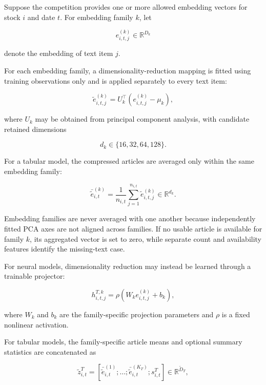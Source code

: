 \documentclass[11pt]{article}
\newcommand{\R}{\mathbb{R}}
\begin{document}
Suppose the competition provides one or more allowed embedding vectors for
stock $i$ and date $t$. For embedding family $k$, let

\begin{equation}
e^{(k)}_{i,t,j}
\in
\R^{D_k}
\end{equation}

denote the embedding of text item $j$.

For each embedding family, a dimensionality-reduction mapping is fitted using
training observations only and is applied separately to every text item:

\begin{equation}
\widetilde e^{(k)}_{i,t,j}
=
U_k^\top
\left(
e^{(k)}_{i,t,j}
-
\mu_k
\right),
\end{equation}

where $U_k$ may be obtained from principal component analysis, with candidate
retained dimensions

\begin{equation}
d_k \in \{16,32,64,128\}.
\end{equation}

For a tabular model, the compressed articles are averaged only within the same
embedding family:

\begin{equation}
\bar{\widetilde e}^{(k)}_{i,t}
=
\frac{1}{n_{i,t}}
\sum_{j=1}^{n_{i,t}}
\widetilde e^{(k)}_{i,t,j}
\in\R^{d_k}.
\end{equation}

Embedding families are never averaged with one another because independently
fitted PCA axes are not aligned across families.  If no usable article is
available for family $k$, its aggregated vector is set to zero, while separate
count and availability features identify the missing-text case.

For neural models, dimensionality reduction may instead be learned through a
trainable projector:

\begin{equation}
h^{T,k}_{i,t,j}
=
\rho
\left(
W_k e^{(k)}_{i,t,j}+b_k
\right),
\end{equation}

where $W_k$ and $b_k$ are the family-specific projection parameters and
$\rho$ is a fixed nonlinear activation.

For tabular models, the family-specific article means and optional summary
statistics are concatenated as

\begin{equation}
\widetilde z^T_{i,t}
=
\left[
\bar{\widetilde e}^{(1)}_{i,t};
\ldots;
\bar{\widetilde e}^{(K_T)}_{i,t};
s^T_{i,t}
\right]
\in\R^{\widetilde D_T},
\end{equation}
\end{document}
